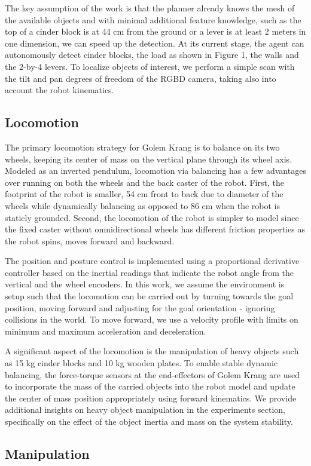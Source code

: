 \documentclass[runningheads,a4paper]{llncs}
\begin{document}
The key assumption of the work is that the planner already knows the mesh of the available objects
and with minimal additional feature knowledge, such as the top of a cinder block is at 44 cm from
the ground or a lever is at least 2 meters in one dimension, we can speed up the detection. At its
current stage, the agent can autonomously detect cinder blocks, the load as shown in Figure 1, the
walls and the 2-by-4 levers. To localize objects of interest, we perform a simple scan with the tilt
and pan degrees of freedom of the RGBD camera, taking also into account the robot kinematics.

\subsection{Locomotion}

The primary locomotion strategy for Golem Krang is to balance on its two wheels, keeping its
center of mass on the vertical plane through its wheel axis. Modeled as an inverted pendulum,
locomotion via balancing has a few advantages over running on both the wheels and the back caster of
the robot. First, the footprint of the robot is smaller, 54 cm front to back due to diameter
of the wheels while dynamically balancing as opposed to 86 cm when the robot is staticly grounded.
Second, the locomotion of the robot is simpler to model since the fixed caster without omnidirectional
wheels has different friction properties as the robot spins, moves forward and backward. 

The position and posture control is implemented using a proportional derivative controller based on
the inertial readings that indicate the robot angle from the vertical and the wheel encoders. In
this work, we assume the environment is setup such that the locomotion can be carried out by
turning towards the goal position, moving forward and adjusting for the goal orientation - ignoring
collisions in the world. To move forward, we use a velocity profile with limits on minimum and maximum
acceleration and deceleration. 

A significant aspect of the locomotion is the manipulation of heavy objects such as 15 kg cinder
blocks and 10 kg wooden plates. To enable stable dynamic balancing, the force-torque sensors
at the end-effectors of Golem Krang are used to incorporate the mass of the carried objects into
the robot model and update the center of mass position appropriately using forward kinematics. We
provide additional insights on heavy object manipulation in the experiments section, specifically
on the effect of the object inertia and mass on the system stability. 

\subsection{Manipulation}



\newpage


\end{document}
